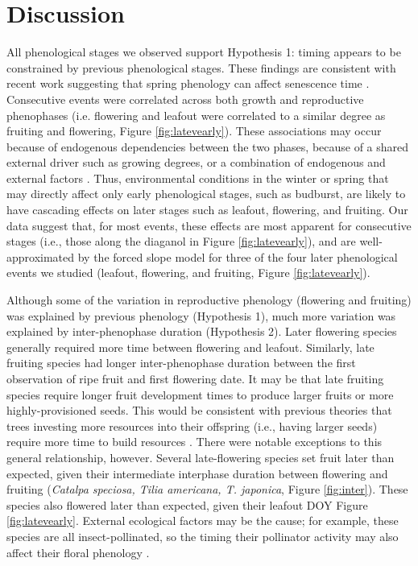 \documentclass{article}
\begin{document}
\section* {Discussion}
\par All phenological stages we observed support Hypothesis 1: timing appears to be constrained by previous phenological stages. These findings are consistent with recent work suggesting that spring phenology can affect senescence time \citep{keenan2015,liu2016}. Consecutive events were correlated across both growth and reproductive phenophases (i.e. flowering and leafout were correlated to a similar degree as fruiting and flowering, Figure \ref{fig:latevearly}). These associations may occur because of endogenous dependencies between the two phases, because of a shared external driver such as growing degrees, or a combination of endogenous and external factors \citep{lechowicz1995}. Thus, environmental conditions in the winter or spring that may directly affect only early phenological stages, such as budburst, are likely to have cascading effects on later stages such as leafout, flowering, and fruiting. Our data suggest that, for most events, these effects are most apparent for consecutive stages (i.e., those along the diaganol in Figure \ref{fig:latevearly}), and are well-approximated by the forced slope model for three of the four later phenological events we studied (leafout, flowering, and fruiting, Figure \ref{fig:latevearly}). 

\par Although some of the variation in reproductive phenology (flowering and fruiting) was explained by previous phenology (Hypothesis 1), much more variation was explained by inter-phenophase duration (Hypothesis 2). Later flowering species generally required more time between flowering and leafout. Similarly, late fruiting species had longer inter-phenophase duration between the first observation of ripe fruit and first flowering date. It may be that late fruiting species require longer fruit development times to produce larger fruits or more highly-provisioned seeds. This would be consistent with previous theories that trees investing more resources into their offspring (i.e., having larger seeds) require more time to build resources \citep{bolmgren2008,sun2011}. There were notable exceptions to this general relationship, however. Several late-flowering species  set fruit later than expected, given their intermediate interphase duration between flowering and fruiting (\textit{Catalpa speciosa, Tilia americana, T. japonica}, Figure \ref{fig:inter}). These species also flowered later than expected, given their leafout DOY Figure \ref{fig:latevearly}. External ecological factors may be the cause; for example, these species are all insect-pollinated, so the timing their pollinator activity may also affect their floral phenology \citep{elzinga2007}.  
\end{document}

